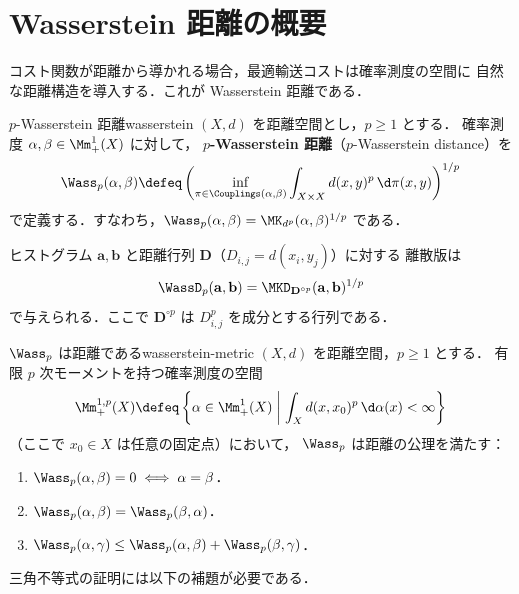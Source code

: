 \section{Wasserstein 距離の概要}
\label{sec:wasserstein-overview}

コスト関数が距離から導かれる場合，最適輸送コストは確率測度の空間に
自然な距離構造を導入する．これが Wasserstein 距離である．

\begin{definition}{$p$-Wasserstein 距離}{wasserstein}
  $(X, d)$ を距離空間とし，$p \geq 1$ とする．
  確率測度 $\alpha, \beta \in \Mm_+^1(X)$ に対して，
  \textbf{$p$-Wasserstein 距離}（$p$-Wasserstein distance）を
  \[
    \Wass_p(\alpha, \beta) \defeq
    \left(
    \inf_{\pi \in \Couplings(\alpha, \beta)}
    \int_{X \times X} d(x, y)^p \, \d\pi(x, y)
    \right)^{1/p}
  \]
  で定義する．すなわち，$\Wass_p(\alpha, \beta) = \MK_{d^p}(\alpha, \beta)^{1/p}$ である．

  ヒストグラム $\mathbf{a}, \mathbf{b}$ と距離行列 $\mathbf{D}$（$D_{i,j} = d(x_i, y_j)$）に対する
  離散版は
  \[
    \WassD_p(\mathbf{a}, \mathbf{b})
    = \MKD_{\mathbf{D}^{\circ p}}(\mathbf{a}, \mathbf{b})^{1/p}
  \]
  で与えられる．ここで $\mathbf{D}^{\circ p}$ は $D_{i,j}^p$ を成分とする行列である．
\end{definition}

\begin{proposition}{$\Wass_p$ は距離である}{wasserstein-metric}
  $(X, d)$ を距離空間，$p \geq 1$ とする．
  有限 $p$ 次モーメントを持つ確率測度の空間
  \[
    \Mm_+^{1,p}(X) \defeq
    \left\{ \alpha \in \Mm_+^1(X) \;\middle|\;
    \int_X d(x, x_0)^p \, \d\alpha(x) < \infty \right\}
  \]
  （ここで $x_0 \in X$ は任意の固定点）において，
  $\Wass_p$ は距離の公理を満たす：
  \begin{enumerate}
    \item $\Wass_p(\alpha, \beta) = 0 \iff \alpha = \beta$．
    \item $\Wass_p(\alpha, \beta) = \Wass_p(\beta, \alpha)$．
    \item $\Wass_p(\alpha, \gamma) \leq \Wass_p(\alpha, \beta) + \Wass_p(\beta, \gamma)$．
  \end{enumerate}
\end{proposition}

三角不等式の証明には以下の補題が必要である．

